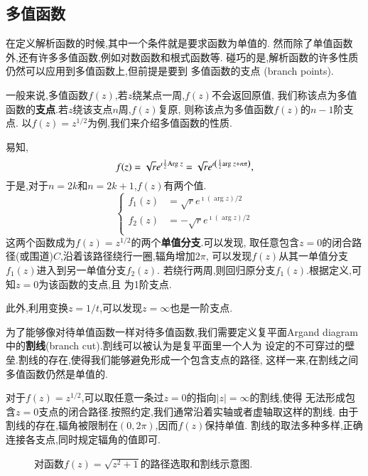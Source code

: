 \subsection{多值函数}
在定义解析函数的时候,其中一个条件就是要求函数为单值的.
然而除了单值函数外,还有许多多值函数,例如对数函数和根式函数等.
碰巧的是,解析函数的许多性质仍然可以应用到多值函数上,但前提是要到
多值函数的支点 (branch points).

一般来说,多值函数$f(z)$,若$z$绕某点一周,$f(z)$不会返回原值,
我们称该点为多值函数的\textbf{支点}.若$z$绕该支点$n$周,$f(z)$复原,
则称该点为多值函数$f(z)$的$n-1$阶支点.
以$f(z) = z^{1/2}$为例,我们来介绍多值函数的性质.

易知,\[
    f(z) = \sqrt{r} e^{\imath {\frac{1}{2}}  {\mathrm{Arg}\;} z}
    =  \sqrt{r} e^{\imath \left( {\frac{1}{2}} {\mathrm{arg}\;} z + n \pi \right)},
    \]
于是,对于$n= 2k$和$n=2k+1$,$f(z)$有两个值.
\begin{equation}
    \left\{\begin{aligned}
    f_1(z) & =\sqrt{r}  e^{\imath(\arg z) / 2} \\
    f_2(z) & =-\sqrt{r}  e^{\imath(\arg z) / 2} \\
    \end{aligned}\right.
\end{equation}
这两个函数成为$f(z)= z^{1/2}$的两个\textbf{单值分支}.可以发现,
取任意包含$z=0$的闭合路径(或围道)$C$,沿着该路径绕行一圈,辐角增加$2\pi$,
可以发现$f(z)$从其一单值分支$f_1(z)$进入到另一单值分支$f_2(z)$.
若绕行两周,则回归原分支$f_1(z)$.根据定义,可知$z=0$为该函数的支点,且
为1阶支点.

此外,利用变换$z=1/t$,可以发现$z=\infty$也是一阶支点.

为了能够像对待单值函数一样对待多值函数,我们需要定义复平面Argand diagram
中的\textbf{割线}(branch cut).割线可以被认为是复平面里一个人为
设定的不可穿过的壁垒.割线的存在,使得我们能够避免形成一个包含支点的路径,
这样一来,在割线之间多值函数仍然是单值的.

对于$f(z)=z^{1/2}$,可以取任意一条过$z=0$的指向$|z|=\infty$的割线,使得
无法形成包含$z=0$支点的闭合路径.按照约定,我们通常沿着实轴或者虚轴取这样的割线.
由于割线的存在,辐角被限制在$(0,2\pi)$,因而$f(z)$保持单值.
割线的取法多种多样,正确连接各支点,同时规定辐角的值即可.

\begin{figure}
    \centering
    
    \caption{对函数$f(z) = \sqrt{z^2 + 1}$的路径选取和割线示意图.}
    \label{fig:contours}
\end{figure}

